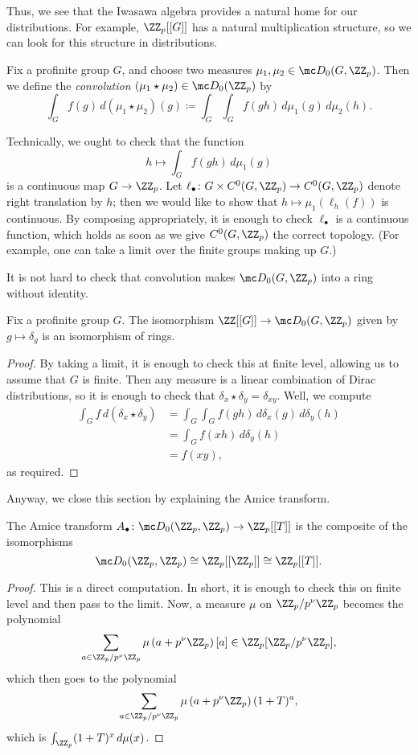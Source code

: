\documentclass{article}
\begin{document}
Thus, we see that the Iwasawa algebra provides a natural home for our distributions. For example, $\ZZ_p[[G]]$ has a natural multiplication structure, so we can look for this structure in distributions.
\begin{definition}[convolution]
	Fix a profinite group $G$, and choose two measures $\mu_1,\mu_2\in\mc D_0(G,\ZZ_p)$. Then we define the \textit{convolution} $(\mu_1\star\mu_2)\in\mc D_0(\ZZ_p)$ by
	\[\int_Gf(g)\,d(\mu_1\star\mu_2)(g)\coloneqq\int_G\int_Gf(gh)\,d\mu_1(g)\,d\mu_2(h).\]
\end{definition}
\begin{remark}
	Technically, we ought to check that the function
	\[h\mapsto\int_Gf(gh)\,d\mu_1(g)\]
	is a continuous map $G\to\ZZ_p$. Let $\ell_\bullet\colon G\times C^0(G,\ZZ_p)\to C^0(G,\ZZ_p)$ denote right translation by $h$; then we would like to show that $h\mapsto\mu_1(\ell_h(f))$ is continuous. By composing appropriately, it is enough to check $\ell_\bullet$ is a continuous function, which holds as soon as we give $C^0(G,\ZZ_p)$ the correct topology. (For example, one can take a limit over the finite groups making up $G$.)
\end{remark}
\begin{remark}
	It is not hard to check that convolution makes $\mc D_0(G,\ZZ_p)$ into a ring without identity.
\end{remark}
\begin{proposition}
	Fix a profinite group $G$. The isomorphism $\ZZ[[G]]\to\mc D_0(G,\ZZ_p)$ given by $g\mapsto\delta_g$ is an isomorphism of rings.
\end{proposition}
\begin{proof}
	By taking a limit, it is enough to check this at finite level, allowing us to assume that $G$ is finite. Then any measure is a linear combination of Dirac distributions, so it is enough to check that $\delta_{x}\star\delta_{y}=\delta_{xy}$. Well, we compute
	\begin{align*}
		\int_Gf\,d(\delta_{x}\star\delta_{y}) &= \int_G\int_Gf(gh)\,d\delta_x(g)\,d\delta_y(h) \\
		&= \int_Gf(xh)\,d\delta_y(h) \\
		&= f(xy),
	\end{align*}
	as required.
\end{proof}
Anyway, we close this section by explaining the Amice transform.
\begin{proposition}
	The Amice transform $A_\bullet\colon\mc D_0(\ZZ_p,\ZZ_p)\to\ZZ_p[[T]]$ is the composite of the isomorphisms
	\[\mc D_0(\ZZ_p,\ZZ_p)\cong\ZZ_p[[\ZZ_p]]\cong\ZZ_p[[T]].\]
\end{proposition}
\begin{proof}
	This is a direct computation. In short, it is enough to check this on finite level and then pass to the limit. Now, a measure $\mu$ on $\ZZ_p/p^\nu\ZZ_p$ becomes the polynomial
	\[\sum_{a\in\ZZ_p/p^\nu\ZZ_p}\mu\left(a+p^\nu\ZZ_p\right)[a]\in\ZZ_p[\ZZ_p/p^\nu\ZZ_p],\]
	which then goes to the polynomial
	\[\sum_{a\in\ZZ_p/p^\nu\ZZ_p}\mu\left(a+p^\nu\ZZ_p\right)(1+T)^a,\]
	which is $\int_{\ZZ_p}(1+T)^x\,d\mu(x)$.
\end{proof}
\end{document}
